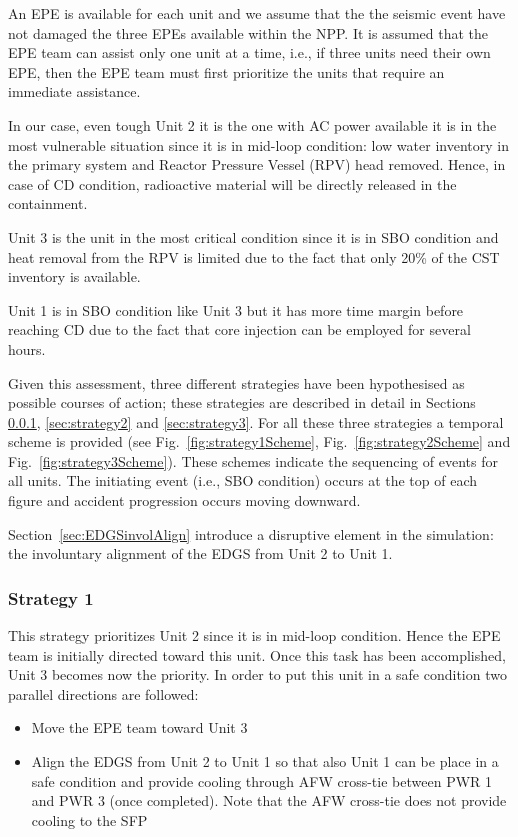 An EPE is available for each unit and we assume that the the seismic event have not damaged the three EPEs available 
within the NPP. It is assumed that the EPE team can assist only one unit at a time, i.e., if three units need their 
own EPE, then the EPE team must first prioritize the units that require an immediate assistance.
  
In our case, even tough Unit 2 it is the one with AC power available it is in the most vulnerable situation since it 
is in mid-loop condition: low water inventory in the primary system and Reactor Pressure Vessel (RPV) head removed. 
Hence, in case of
CD condition, radioactive material will be directly released in the containment.

Unit 3 is the unit in the most critical condition since it is in SBO condition and heat removal from the RPV is limited
due to the fact that only 20\% of the CST inventory is available.

Unit 1 is in SBO condition like Unit 3 but it has more time margin before reaching CD due to the fact that core injection 
can be employed for several hours.

Given this assessment, three different strategies have been hypothesised as possible courses of action; these strategies
are described in detail in Sections \ref{sec:strategy1}, \ref{sec:strategy2} and \ref{sec:strategy3}.
For all these three strategies a temporal scheme is provided (see Fig.~\ref{fig:strategy1Scheme}, 
Fig.~\ref{fig:strategy2Scheme} and Fig.~\ref{fig:strategy3Scheme}). These schemes indicate the sequencing of events 
for all units. The initiating event (i.e., SBO condition) occurs at the top of each figure and accident progression 
occurs moving downward.

Section~\ref{sec:EDGSinvolAlign} introduce a disruptive element in the simulation: the involuntary alignment of the EDGS
from Unit 2 to Unit 1.


\subsubsection{Strategy 1}
\label{sec:strategy1}
This strategy prioritizes Unit 2 since it is in mid-loop condition. Hence the EPE team is initially directed toward
this unit. 
Once this task has been accomplished, Unit 3 becomes now the priority. In order to put this unit in a safe 
condition two parallel directions are followed:

\begin{itemize}
  \item Move the EPE team toward Unit 3 
  \item Align the EDGS from Unit 2 to Unit 1 so that also Unit 1 can be place in a safe condition and provide cooling 
        through AFW cross-tie between PWR 1 and PWR 3 (once completed). Note that the AFW cross-tie does not provide 
        cooling to the SFP
\end{itemize}

